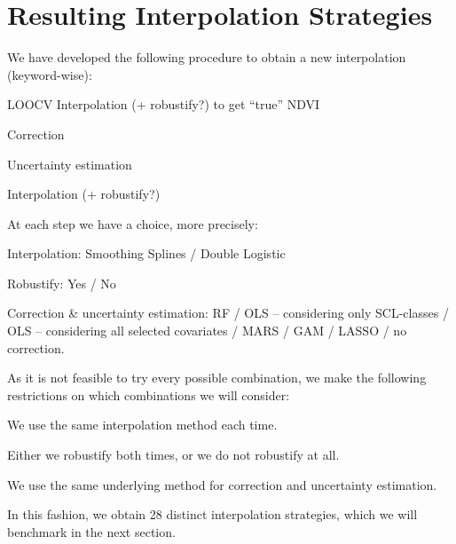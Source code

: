 \section{Resulting Interpolation Strategies}{
    \label{sec:corr_itpl_stat}
    We have developed the following procedure to obtain a new interpolation (keyword-wise):
    \begin{Nenumerate}
        \item LOOCV Interpolation (+ robustify?) to get ``true'' NDVI
        \item Correction 
        \item Uncertainty estimation
        \item Interpolation (+ robustify?)
    \end{Nenumerate}
    At each step we have a choice, more precisely:
    \begin{Nitemize}
        \item Interpolation: Smoothing Splines / Double Logistic
        \item Robustify: Yes / No
        \item Correction \& uncertainty estimation: RF / OLS -- considering only SCL-classes / OLS -- considering all selected covariates / MARS / GAM / LASSO / no correction.
    \end{Nitemize}
    As it is not feasible to try every possible combination, we make the following restrictions on which combinations we will consider:
    \begin{Nitemize}
        \item We use the same interpolation method each time.
        \item Either we robustify both times, or we do not robustify at all.
        \item We use the same underlying method for correction and uncertainty estimation.
    \end{Nitemize}

    In this fashion, we obtain 28 distinct interpolation strategies, which we will benchmark in the next section.
}

